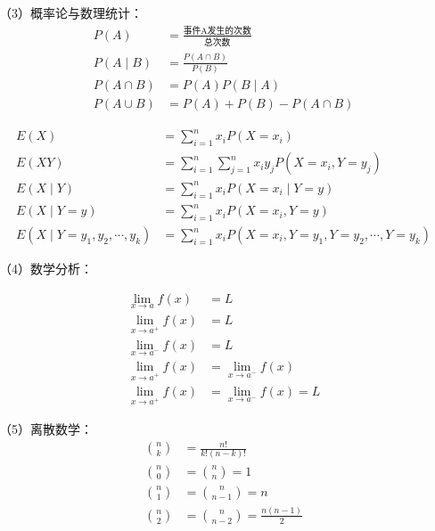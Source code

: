 \begin{ujnbody}
    （3）概率论与数理统计：
    \begin{equation}
        \begin{split}
            P(A) &= \frac{\text{事件A发生的次数}}{\text{总次数}} \\
            P(A \mid B) &= \frac{P(A \cap B)}{P(B)} \\
            P(A \cap B) &= P(A)P(B \mid A) \\
            P(A \cup B) &= P(A) + P(B) - P(A \cap B)
        \end{split}
    \end{equation}

    \begin{equation}
        \begin{split}
            E(X) &= \sum_{i=1}^n x_iP(X=x_i) \\
            E(XY) &= \sum_{i=1}^n \sum_{j=1}^n x_iy_jP(X=x_i,Y=y_j) \\
            E(X \mid Y) &= \sum_{i=1}^n x_iP(X=x_i \mid Y=y) \\
            E(X \mid Y=y) &= \sum_{i=1}^n x_iP(X=x_i,Y=y) \\
            E(X \mid Y=y_1,y_2,\cdots,y_k) &= \sum_{i=1}^n x_iP(X=x_i,Y=y_1,Y=y_2,\cdots,Y=y_k)
        \end{split}
    \end{equation}

    （4）数学分析：

    \begin{equation}
        \begin{split}
            \lim_{x \to a}f(x) &= L \\
            \lim_{x \to a^+}f(x) &= L \\
            \lim_{x \to a^-}f(x) &= L \\
            \lim_{x \to a^+}f(x) &= \lim_{x \to a^-}f(x) \\
            \lim_{x \to a^+}f(x) &= \lim_{x \to a^-}f(x) = L
        \end{split}
    \end{equation}

    （5）离散数学：
    \begin{equation}
        \begin{split}
            \binom{n}{k} &= \frac{n!}{k!(n-k)!} \\
            \binom{n}{0} &= \binom{n}{n} = 1 \\
            \binom{n}{1} &= \binom{n}{n-1} = n \\
            \binom{n}{2} &= \binom{n}{n-2} = \frac{n(n-1)}{2}
        \end{split}
    \end{equation}


\end{ujnbody}
